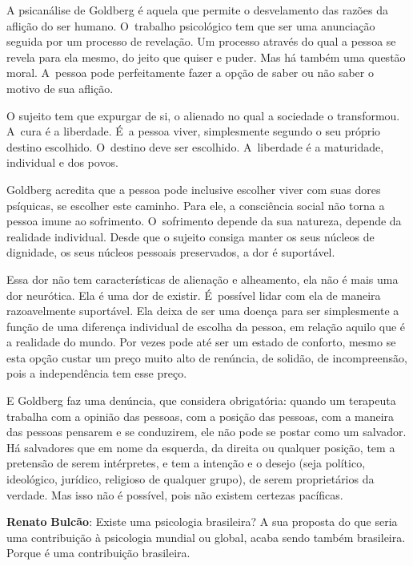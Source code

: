 A psicanálise de Goldberg é aquela que permite o desvelamento das razões
da aflição do ser humano. O~trabalho psicológico tem que ser uma
anunciação seguida por um processo de revelação. Um processo através do
qual a pessoa se revela para ela mesmo, do jeito que quiser e puder. Mas
há também uma questão moral. A~pessoa pode perfeitamente fazer a opção
de saber ou não saber o motivo de sua aflição.

O sujeito tem que expurgar de si, o alienado no qual a sociedade o
transformou. A~cura é a liberdade. É~a pessoa viver, simplesmente
segundo o seu próprio destino escolhido. O~destino deve ser escolhido. A~liberdade é a maturidade, individual e dos povos.

Goldberg acredita que a pessoa pode inclusive escolher viver com suas
dores psíquicas, se escolher este caminho. Para ele, a consciência
social não torna a pessoa imune ao sofrimento. O~sofrimento depende da
sua natureza, depende da realidade individual. Desde que o sujeito
consiga manter os seus núcleos de dignidade, os seus núcleos pessoais
preservados, a dor é suportável.

Essa dor não tem características de alienação e alheamento, ela não é
mais uma dor neurótica. Ela é uma dor de existir. É~possível lidar com
ela de maneira razoavelmente suportável. Ela deixa de ser uma doença
para ser simplesmente a função de uma diferença individual de escolha da
pessoa, em relação aquilo que é a realidade do mundo. Por vezes pode até
ser um estado de conforto, mesmo se esta opção custar um preço muito
alto de renúncia, de solidão, de incompreensão, pois a independência tem
esse preço.

E Goldberg faz uma denúncia, que considera obrigatória: quando um
terapeuta trabalha com a opinião das pessoas, com a posição das pessoas,
com a maneira das pessoas pensarem e se conduzirem, ele não pode se
postar como um salvador. Há salvadores que em nome da esquerda, da
direita ou qualquer posição, tem a pretensão de serem intérpretes, e tem
a intenção e o desejo (seja político, ideológico, jurídico, religioso de
qualquer grupo), de serem proprietários da verdade. Mas isso não é
possível, pois não existem certezas pacíficas.

\begin{center}\asterisc{}\end{center}

  \abrefala

\textbf{Renato} \textbf{Bulcão}: Existe uma psicologia brasileira? A sua
proposta do que seria uma contribuição à psicologia mundial ou global,
acaba sendo também brasileira. Porque é uma contribuição brasileira.

